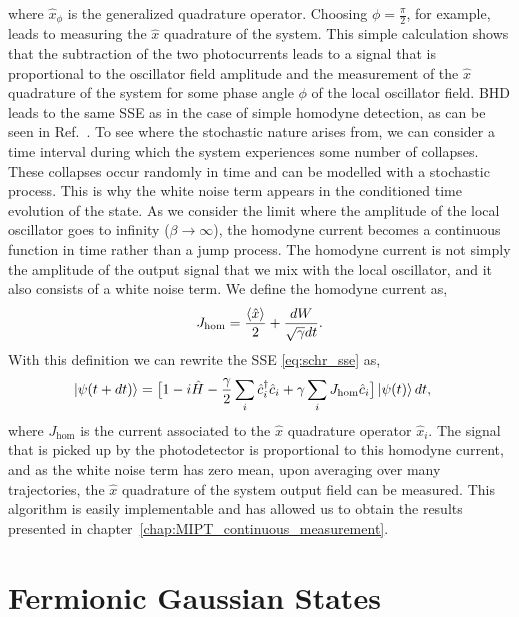 where $\hat{x}_\phi$ is the generalized quadrature operator. Choosing $\phi = \frac{\pi}{2}$, for example, leads to measuring the $\hat{x}$ quadrature of the system. This simple calculation shows that the subtraction of the two photocurrents leads to a signal that is proportional to the oscillator field amplitude and the measurement of the $\hat{x}$ quadrature of the system for some phase angle $\phi$ of the local oscillator field. BHD leads to the same SSE as in the case of simple homodyne detection, as can be seen in Ref.~\cite{carmichael1993}. To see where the stochastic nature arises from, we can consider a time interval during which the system experiences some number of collapses. These collapses occur randomly in time and can be modelled with a stochastic process. This is why the white noise term appears in the conditioned time evolution of the state. As we consider the limit where the amplitude of the local oscillator goes to infinity ($\beta \to \infty$), the homodyne current becomes a continuous function in time rather than a jump process. The homodyne current is not simply the amplitude of the output signal that we mix with the local oscillator, and it also consists of a white noise term. We define the homodyne current as, 
\begin{equation}
\label{eq:Jhom}
    J_\text{hom} = \frac{\expval{\hat{x}}}{2} + \frac{dW}{\sqrt{\gamma} dt}.
\end{equation}
With this definition we can rewrite the SSE \ref{eq:schr_sse} as, 
\begin{align}
\label{eq:schr_sse_hom}
\begin{split}
    \ket{\psi(t+dt)} &= \big[ 1 - i \hat{H} - \frac{\gamma}{2} \sum\limits_i \hat{c}^\dagger_i \hat{c}_i + \gamma \sum\limits_i J_\text{hom} \hat{c}_i \big] \ket{\psi(t)} dt,
\end{split}
\end{align}
where $J_\text{hom}$ is the current associated to the $\hat{x}$ quadrature operator $\hat{x}_i$. The signal that is picked up by the photodetector is proportional to this homodyne current, and as the white noise term has zero mean, upon averaging over many trajectories, the $\hat{x}$ quadrature of the system output field can be measured. This algorithm is easily implementable and has allowed us to obtain the results presented in chapter~\ref{chap:MIPT_continuous_measurement}.

\section{Fermionic Gaussian States}
\label{sec:FGS}

